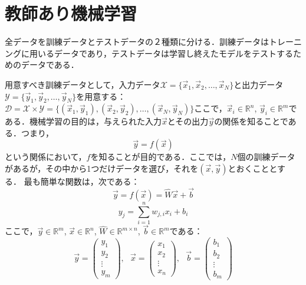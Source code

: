 \section{教師あり機械学習}
全データを訓練データとテストデータの２種類に分ける．訓練データはトレーニングに用いるデータであり，テストデータは学習し終えたモデルをテストするためのデータである．

用意すべき訓練データとして，入力データ$\mathcal{X}=\{\vec{x}_1,\vec{x}_2,\ldots,\vec{x}_N\}$と出力データ$\mathcal{Y}=\{\vec{y}_1,\vec{y}_2,\ldots,\vec{y}_N\}$を用意する：$\mathcal{D}=\mathcal{X}\times\mathcal{Y}=\{(\vec{x}_1,\vec{y}_1),(\vec{x}_2,\vec{y}_2),\ldots,(\vec{x}_N,\vec{y}_N)\}$ここで，$\vec{x}_i\in\mathbb{R}^n$, $\vec{y}_i\in\mathbb{R}^m$である．機械学習の目的は，与えられた入力$\vec{x}$とその出力$\vec{y}$の関係を知ることである．つまり，
\begin{equation}
    \vec{y} = f(\vec{x})
\end{equation}
という関係において，$f$を知ることが目的である．ここでは，$N$個の訓練データがあるが，その中から1つだけデータを選び，それを$(\vec{x},\vec{y})$とおくこととする．
最も簡単な関数は，次である：
\begin{equation}
    \vec{y}=f(\vec{x}) = \hat{W}\vec{x} + \vec{b}
\end{equation}
\begin{equation}
    y_j= \sum_{i=1}^{n}w_{j,i}x_i + b_i
\end{equation}
ここで，$\vec{y}\in\mathbb{R}^m$, $\vec{x}\in\mathbb{R}^n$, $\hat{W}\in\mathbb{R}^{m\times n}$, $\vec{b}\in\mathbb{R}^m$である：
\begin{equation}
     \vec{y}=\left(
        \begin{array}{c}
       y_1\\[10pt]
       y_2\\[10pt]
       \vdots\\[10pt]
       y_m
        \end{array}
        \right),\ \ \ 
        \vec{x}=\left(
        \begin{array}{c}
          x_1\\[10pt]
       x_2\\[10pt]
       \vdots\\[10pt]
       x_n
        \end{array}
        \right),\ \ \ 
        \vec{b}=\left(
        \begin{array}{c}
          b_1\\[10pt]
       b_2\\[10pt]
       \vdots\\[10pt]
       b_m
        \end{array}
        \right)
\end{equation}


